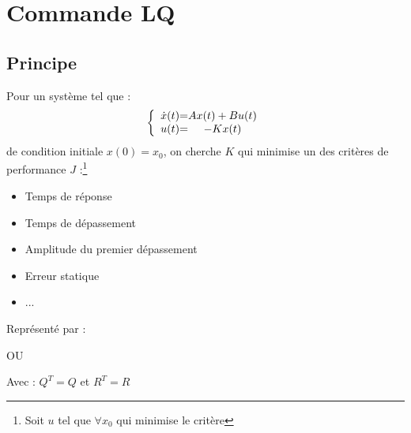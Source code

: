 {{{\section{Commande LQ}
\subsection{Principe}
\large{Pour un système tel que :}
\[
    \left \{
    \begin{array}{c @{=} c}
        \dot x(t) & Ax(t) + Bu(t)\\
        u(t) & -Kx(t)
    \end{array}
    \right.
\]
\large{de condition initiale $x(0) = x_{0}$, on cherche $K$ qui minimise un des critères de performance $J$ :\footnote{Soit $u$ tel que $\forall x_{0}$ qui minimise le critère} }
\begin{itemize}
    \item Temps de réponse
    \item Temps de dépassement
    \item Amplitude du premier dépassement
    \item Erreur statique
    \item ...
\end{itemize}
\large{Représenté par :}
\begin{center}
    \Large{} OU
    \newline
    \Large{}
\end{center}
\large{Avec : $Q^{T} = Q$ et $R^{T} = R$}
}}}
